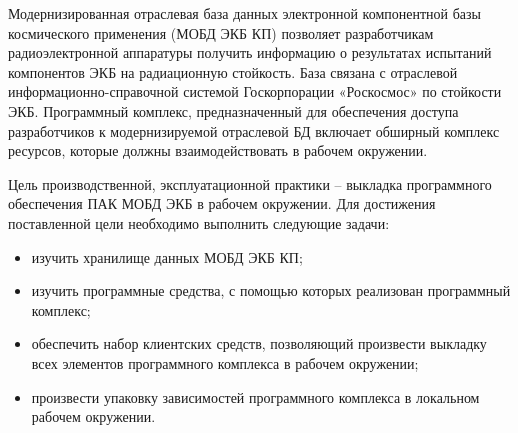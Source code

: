 \setcounter{page}{2}

Модернизированная отраслевая база данных электронной компонентной базы космического применения (МОБД ЭКБ КП) позволяет разработчикам радиоэлектронной аппаратуры получить информацию о результатах испытаний компонентов ЭКБ на радиационную стойкость. База связана с отраслевой информационно-справочной системой Госкорпорации «Роскосмос» по стойкости ЭКБ. Программный комплекс, предназначенный для обеспечения доступа разработчиков к модернизируемой отраслевой БД включает обширный комплекс ресурсов, которые должны взаимодействовать в рабочем окружении. 

Цель производственной, эксплуатационной практики -- выкладка программного обеспечения ПАК МОБД ЭКБ в рабочем окружении. Для достижения поставленной цели необходимо выполнить следующие задачи:
\begin{itemize}
	\item изучить хранилище данных МОБД ЭКБ КП;
	\item изучить программные средства, с помощью которых реализован программный комплекс;
	\item обеспечить набор клиентских средств, позволяющий произвести выкладку всех элементов программного комплекса в рабочем окружении;
	\item произвести упаковку зависимостей программного комплекса в локальном рабочем окружении.
\end{itemize}